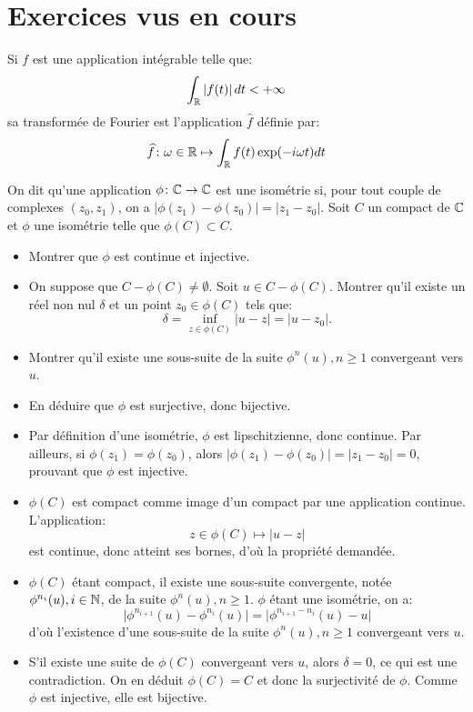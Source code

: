 \documentclass[a4paper, 12pt]{amsart}
\begin{document}
\section{Exercices vus en cours}
Si $f$ est une application intégrable telle que:
\[
\int_{\mathbb{R}} \left | f(t) \right| dt < +\infty
\]
sa transformée de Fourier est l'application $\widehat{f}$ définie par:
\[
\widehat{f} \colon \omega \in \mathbb{R} \mapsto \int_{\mathbb{R}} f(t) \exp(-i \omega t ) dt
\]
\begin{fex}
    On dit qu'une application $\phi \colon \mathbb{C} \to \mathbb{C}$ est une isométrie si, pour tout couple
    de complexes $(z_0,z_1)$, on a $\lvert \phi(z_1)-\phi(z_0)\rvert = \lvert z_1-z_0\rvert.$ 
    Soit $C$ un compact de $\mathbb{C}$ et $\phi$ une isométrie telle que $\phi(C) \subset C.$
    \begin{itemize}
        \item Montrer que $\phi$ est continue et injective.
        \item On suppose que $C-\phi(C) \neq \emptyset.$ Soit $u \in C -\phi(C).$ Montrer qu'il existe un réel non nul $\delta$ et un point $z_0 \in \phi(C)$ tels que:
        \[
        \delta = \inf_{z \in \phi(C)} \lvert u - z \rvert = \lvert u - z_0 \rvert.
        \]
        \item Montrer qu'il existe une sous-suite de la suite $\phi^n(u), n \geq 1$ convergeant 
        vers $u$.
        \item En déduire que $\phi$ est surjective, donc bijective.
    \end{itemize}
\end{fex}
\begin{itemize}
    \item Par définition d'une isométrie, $\phi$ est lipschitzienne, donc continue. Par ailleurs, si $\phi(z_1)=\phi(z_0)$, alors $\lvert \phi(z_1) - \phi(z_0)\rvert = \lvert z_1 - z_0 \rvert = 0$, prouvant que $\phi$ est injective.
    \item $\phi(C)$ est compact comme image d'un compact par une application continue. L'application:
    \[
        z \in \phi(C) \mapsto \lvert u- z \rvert 
    \]
    est continue, donc atteint ses bornes, d'où la propriété demandée.
    \item $\phi(C)$ étant compact, il existe une sous-suite convergente, notée $\phi^{n_i}(u), i \in \mathbb{N}$, de la suite $\phi^{n}(u), n \geq 1$. $\phi$ étant une isométrie, on a:
    \[
    \lvert \phi^{n_{i+1}}(u) - \phi^{n_i}(u)  \rvert = \lvert \phi^{n_{i+1}-n_i}(u) - u \rvert
    \]
    d'où l'existence d'une sous-suite de la suite $\phi^{n}(u), n \geq 1$ convergeant vers $u$.
    \item S'il existe une suite de $\phi(C)$ convergeant vers $u$, alors $\delta=0$, ce qui est une contradiction. On en déduit $\phi(C)=C$ et donc la surjectivité de $\phi.$ Comme $\phi$ est injective, elle est bijective.
\end{itemize}
\end{document}
